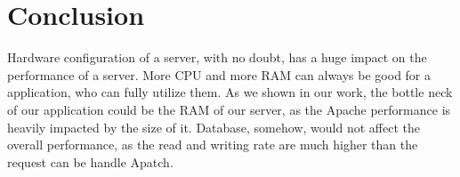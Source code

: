 \documentclass[10pt,letterpaper]{article}
\begin{document}
\section{Conclusion}
Hardware configuration of a server, with no doubt, has a huge impact on the performance of a server. More CPU and more RAM can always be good for a application, who can fully utilize them. As we shown in our work, the bottle neck of our application could be the RAM of our server, as the Apache performance is heavily impacted by the size of it. Database, somehow, would not affect the overall performance, as the read and writing rate are much higher than the request can be handle Apatch.
\end{document}
